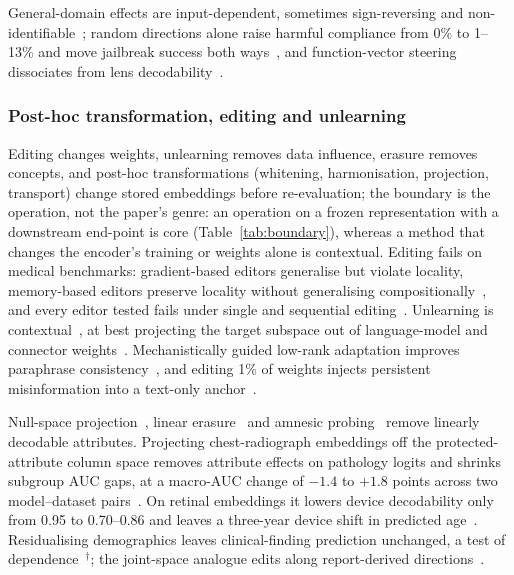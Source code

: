 General-domain effects are input-dependent, sometimes sign-reversing and
non-identifiable~\cite{tan2024steeringreliability,braun2025understanding,venkatesh2026nonident};
random directions alone raise harmful compliance from 0\% to 1--13\% and move jailbreak success both
ways~\cite{korznikov2025the,li2026analysing}, and function-vector steering dissociates from lens
decodability~\cite{nadaf2026steerable}.

\subsubsection{Post-hoc transformation, editing and unlearning}

Editing changes weights, unlearning removes data influence, erasure removes concepts, and post-hoc
transformations (whitening, harmonisation, projection, transport) change stored embeddings before re-evaluation;
the boundary is the operation, not the paper's genre: an operation on a frozen representation with a downstream
end-point is core (Table~\ref{tab:boundary}), whereas a method that changes the encoder's training or weights
alone is contextual. Editing fails on medical benchmarks: gradient-based editors
generalise but violate locality, memory-based editors preserve locality without generalising
compositionally~\cite{zhu2026evaluating}, and every editor tested fails under single and sequential
editing~\cite{xu2025medmkeb,wen2025multimededit}. Unlearning is
contextual~\cite{guo2026exploring,hardan2025forgetmi,xu2025from}, at best projecting the target
subspace out of language-model and connector weights~\cite{wu2025hierarchy}. Mechanistically guided
low-rank adaptation improves paraphrase consistency~\cite{sadanandan2026mechanistically}, and
editing 1\% of weights injects persistent misinformation into a text-only
anchor~\cite{han2024medical}.

Null-space projection~\cite{ravfogel2020null,ravfogel2022linear}, linear
erasure~\cite{belrose2023leace} and amnesic probing~\cite{elazar2020amnesic} remove linearly
decodable attributes. Projecting chest-radiograph embeddings off the protected-attribute column
space removes attribute effects on pathology logits and shrinks subgroup AUC gaps, at a macro-AUC change of
$-1.4$ to $+1.8$ points across two model--dataset pairs~\cite{weber2023posthoc}. On retinal embeddings it lowers device decodability only from 0.95 to
0.70--0.86 and leaves a three-year device shift in predicted age~\cite{li2026acquisition}.
Residualising demographics leaves clinical-finding prediction unchanged, a test of
dependence~\cite{kim2026encoding}$^{\dagger}$; the joint-space analogue edits along report-derived
directions~\cite{sadashivaiah2024explaining}.


